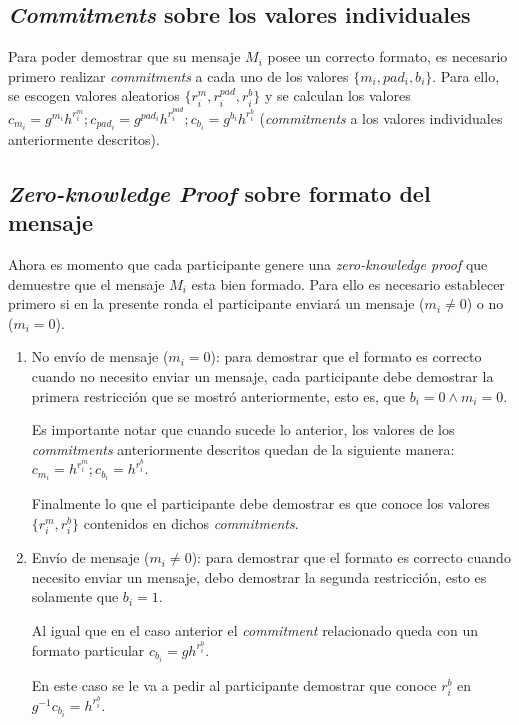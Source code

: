 \subsection{\emph{Commitments} sobre los valores individuales}

Para poder demostrar que su mensaje $M_i$ posee un correcto formato, es necesario primero realizar \emph{commitments} a cada uno de los valores $\{m_i, pad_i, b_i\}$. Para ello, se escogen valores aleatorios $\{r_i^m, r_i^{pad}, r_i^b\}$ y se calculan los valores $c_{m_i} = g^{m_i} h^{r_i^m}; c_{pad_i} = g^{pad_i} h^{r_i^{pad}}; c_{b_i} = g^{b_i} h^{r_i^b}$ (\emph{commitments} a los valores individuales anteriormente descritos).

\subsection{\emph{Zero-knowledge Proof} sobre formato del mensaje}

Ahora es momento que cada participante genere una \emph{zero-knowledge proof} que demuestre que el mensaje $M_i$ esta bien formado. Para ello es necesario establecer primero si en la presente ronda el participante enviará un mensaje ($m_i \neq 0$) o no ($m_i = 0$).

\begin{enumerate}
    \item No envío de mensaje ($m_i = 0$): para demostrar que el formato es correcto cuando no necesito enviar un mensaje, cada participante debe demostrar la primera restricción que se mostró anteriormente, esto es, que $b_i = 0 \land m_i = 0$.
    
    Es importante notar que cuando sucede lo anterior, los valores de los \emph{commitments} anteriormente descritos quedan de la siguiente manera: $c_{m_i} = h^{r_i^m}; c_{b_i} = h^{r_i^b}$.
    
    Finalmente lo que el participante debe demostrar es que conoce los valores $\{r_i^m, r_i^b\}$ contenidos en dichos \emph{commitments}.
    \item Envío de mensaje ($m_i \neq 0$): para demostrar que el formato es correcto cuando necesito enviar un mensaje, debo demostrar la segunda restricción, esto es solamente que $b_i = 1$.
    
    Al igual que en el caso anterior el \emph{commitment} relacionado queda con un formato particular $c_{b_i} = g h^{r_i^b}$.
    
    En este caso se le va a pedir al participante demostrar que conoce $r_i^b$ en $g^{-1} c_{b_i} = h^{r_i^b}$.
\end{enumerate}

